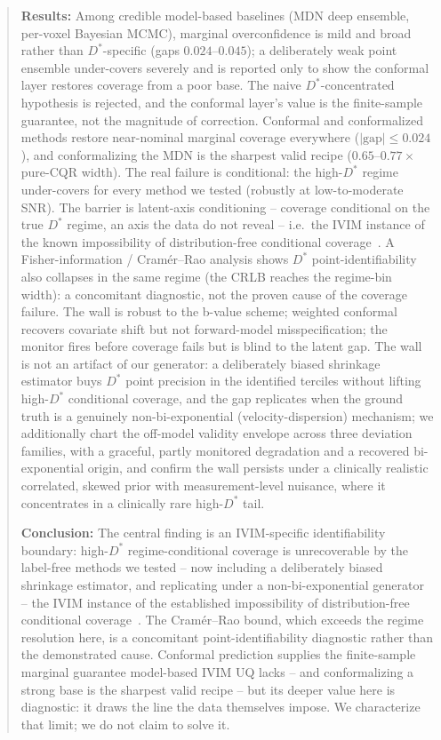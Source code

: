 \documentclass[11pt]{article}
\newcommand{\Dstar}{D^{*}}
\begin{document}
\begin{abstract}
\noindent
\textbf{Results:} Among credible model-based baselines (MDN deep
ensemble, per-voxel Bayesian MCMC), marginal overconfidence is mild and broad
rather than $\Dstar$-specific (gaps $0.024$--$0.045$); a deliberately weak point
ensemble under-covers severely and is reported only to show the conformal layer
restores coverage from a poor base. The naive $\Dstar$-concentrated hypothesis is
rejected, and the conformal layer's value is the finite-sample guarantee, not the
magnitude of correction. Conformal and conformalized methods restore near-nominal
marginal coverage everywhere ($|\text{gap}|\le 0.024$), and conformalizing the MDN
is the sharpest valid recipe ($0.65$--$0.77\times$ pure-CQR width). The real
failure is conditional: the high-$\Dstar$ regime under-covers for every method we
tested (robustly at low-to-moderate SNR). The barrier is latent-axis conditioning
-- coverage conditional on the true $\Dstar$ regime, an axis the data do not reveal
-- i.e.\ the IVIM instance of the known impossibility of distribution-free
conditional coverage~\citep{barber2021limits}. A Fisher-information /
Cram\'er--Rao analysis shows $\Dstar$ point-identifiability also collapses in the
same regime (the CRLB reaches the regime-bin width): a concomitant diagnostic, not
the proven cause of the coverage failure.
The wall is robust to the b-value scheme; weighted conformal recovers covariate
shift but not forward-model misspecification; the monitor fires before coverage
fails but is blind to the latent gap. The wall is not an artifact of our generator:
a deliberately biased shrinkage estimator buys $\Dstar$ point precision in the
identified terciles without lifting high-$\Dstar$ conditional coverage, and the gap
replicates when the ground truth is a genuinely non-bi-exponential
(velocity-dispersion) mechanism; we additionally chart the off-model validity
envelope across three deviation families, with a graceful, partly monitored
degradation and a recovered bi-exponential origin, and confirm the wall persists
under a clinically realistic correlated, skewed prior with measurement-level
nuisance, where it concentrates in a clinically rare high-$\Dstar$ tail.

\noindent
\textbf{Conclusion:} The central finding is an IVIM-specific identifiability
boundary: high-$\Dstar$ regime-conditional coverage is unrecoverable by the
label-free methods we tested -- now including a deliberately biased shrinkage
estimator, and replicating under a non-bi-exponential generator -- the IVIM instance
of the established impossibility of distribution-free conditional
coverage~\citep{barber2021limits}. The
Cram\'er--Rao bound, which exceeds the regime resolution here, is a concomitant
point-identifiability diagnostic rather than the demonstrated cause.
Conformal prediction supplies the finite-sample marginal guarantee model-based
IVIM UQ lacks -- and conformalizing a strong base is the sharpest valid recipe --
but its deeper value here is diagnostic: it draws the line the data themselves
impose. We characterize that limit; we do not claim to solve it.
\end{abstract}
\end{document}
